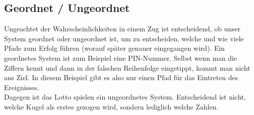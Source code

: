 \subsection{Geordnet / Ungeordnet}
Ungeachtet der Wahrscheinlichkeiten in einem Zug ist entscheidend, ob unser System geordnet oder ungeordnet ist, um zu entscheiden, welche und wie viele Pfade zum Erfolg führen (worauf später genauer eingegangen wird). Ein geordnetes System ist zum Beispiel eine PIN-Nummer. Selbst wenn man die Ziffern kennt und dann in der falschen Reihenfolge eingetippt, kommt man nicht ans Ziel. In diesem Beispiel gibt es also nur einen Pfad für das Eintreten des Ereignisses.\\
Dagegen ist das Lotto spielen ein ungeordnetes System. Entscheidend ist nicht, welche Kugel als erstes gezogen wird, sondern lediglich welche Zahlen.

